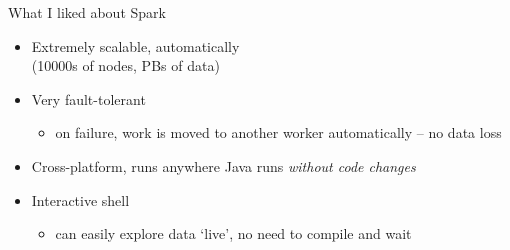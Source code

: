 \documentclass[xcolor=dvipsnames]{beamer}
\begin{document}
\begin{frame}[t]{What I liked about Spark}
	\begin{itemize}
		\item Extremely scalable, automatically\\(10000s of nodes, PBs of data)
		\pause
		\item Very fault-tolerant
			\begin{itemize}
				\item on failure, work is moved to another worker automatically -- no data loss
			\end{itemize}
		\pause
		\item Cross-platform, runs anywhere Java runs \textit{without code changes}
		\pause
		\item Interactive shell
			\begin{itemize}
				\item can easily explore data `live', no need to compile and wait
			\end{itemize}
	\end{itemize}
\end{frame}
\end{document}
